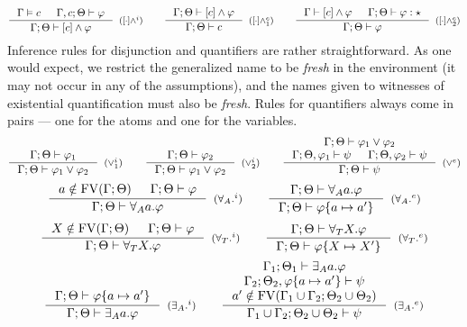 \documentclass[english, mgr]{iithesis}
\renewcommand{\it}[1]{\textit{#1}}
\begin{document}
$$
  \inference{
    \cjgmnt[\cEnv]{\constr} &
    \jgmnt[\cEnv, \constr;\Theta]{\formphi}
  }{
    \jgmnt[\cEnv;\Theta]{\fCAnd{\constr}\formphi}
  }[(\ensuremath{\fCAnd{\cdot}^i})]
  \qquad
  \inference{
    \jgmnt[\cEnv;\Theta]{\fCAnd{\constr}\formphi}
    }{
    \jgmnt[\cEnv;\Theta]{\constr}
  }[(\ensuremath{\fCAnd{\cdot}^e_1})]\qquad
  \inference{
    \jgmnt[\cEnv]{\fCAnd{\constr}\formphi} &
    \jgmnt[\cEnv;\Theta]{\formphi: \kProp}
    }{
    \jgmnt[\cEnv;\Theta]{\formphi}
  }[(\ensuremath{\fCAnd{\cdot}^e_2})]
$$
Inference rules for disjunction and quantifiers are rather straightforward.
As one would expect, we restrict the generalized name to be \it{fresh} in the environment (it may not occur in any of the assumptions),
and the names given to witnesses of existential quantification must also be \it{fresh}.
Rules for quantifiers always come in pairs --- one for the atoms and one for the variables.
$$
  \inference{
    \jgmnt[\cEnv;\Theta]{\formphi_1}
    }{
    \jgmnt[\cEnv;\Theta]{\formphi_1 \vee \formphi_2}
  }[(\ensuremath{\vee^i_1})]
  \qquad
  \inference{
    \jgmnt[\cEnv;\Theta]{\formphi_2}
  }{
    \jgmnt[\cEnv;\Theta]{\formphi_1 \vee \formphi_2}
  }[(\ensuremath{\vee^i_2})]
  \qquad
  \inference{
    \jgmnt[\cEnv;\Theta]{\formphi_1 \vee \formphi_2} \\
    \jgmnt[\cEnv;\Theta,\formphi_1]{\psi} &
    \jgmnt[\cEnv;\Theta,\formphi_2]{\psi}
  }{
    \jgmnt[\cEnv;\Theta]{\psi}
  }[(\ensuremath{\vee^e})]
$$
$$
  \inference{
    \atomv \notin \fv[\cEnv;\Theta] &
    \jgmnt[\cEnv;\Theta]{\formphi}
  }{
    \jgmnt[\cEnv;\Theta]{\fForallAtom{\atomv}\formphi}
  }[(\ensuremath{{\fForallAtom{}}^i})]
  \qquad
  \inference{
    \jgmnt[\cEnv;\Theta]{\fForallAtom{\atomv}\formphi}
  }{
    \jgmnt[\cEnv;\Theta]{\formphi \{\atomv \mapsto \atomv'\}}
  }[(\ensuremath{{\fForallAtom{}}^e})]
$$
$$
  \inference{
    \termv \notin \fv[\cEnv;\Theta] &
    \jgmnt[\cEnv;\Theta]{\formphi}
  }{
    \jgmnt[\cEnv;\Theta]{\fForallTerm{\termv}\formphi}
  }[(\ensuremath{{\fForallTerm{}}^i})]
  \qquad
  \inference{
    \jgmnt[\cEnv;\Theta]{\fForallTerm{\termv}\formphi}
  }{
    \jgmnt[\cEnv;\Theta]{\formphi \{\termv \mapsto \termv'\}}
  }[(\ensuremath{{\fForallTerm{}}^e})]
$$
$$
  \inference{
    \jgmnt[\cEnv;\Theta]{\formphi \{\atomv \mapsto \atomv'\}}
    }{
    \jgmnt[\cEnv;\Theta]{\fExistsAtom{\atomv}\formphi}
  }[(\ensuremath{{\fExistsAtom{}}^i})]
  \qquad
  \inference{
    \jgmnt[\cEnv_1;\Theta_1]{\fExistsAtom{\atomv}\formphi} \\
    \jgmnt[\cEnv_2;\Theta_2,\formphi \{\atomv \mapsto \atomv'\}]{\psi} \\
    \atomv' \notin \fv[\cEnv_1 \cup \cEnv_2;\Theta_2 \cup \Theta_2]
    }{
    \jgmnt[\cEnv_1 \cup \cEnv_2;\Theta_2 \cup \Theta_2]{\psi}
  }[(\ensuremath{{\fExistsAtom{}}^e})]
$$
\end{document}
